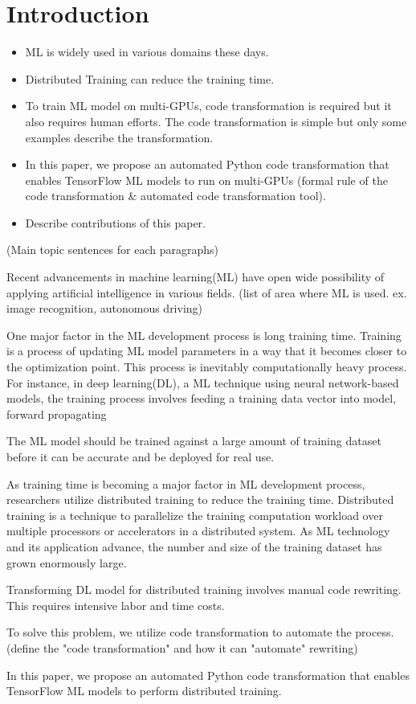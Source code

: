 \section{Introduction}\label{sec:intro}
\begin{itemize}
  \item ML is widely used in various domains these days.
  \item Distributed Training can reduce the training time.
  \item To train ML model on multi-GPUs, code transformation is required but it
    also requires human efforts. The code transformation is simple but only
    some examples describe the transformation.
  \item In this paper, we propose an automated Python code transformation that
    enables TensorFlow ML models to run on multi-GPUs (formal rule of the code
    transformation \& automated code transformation tool).
  \item Describe contributions of this paper.
\end{itemize}

(Main topic sentences for each paragraphs)

Recent advancements in machine learning(ML) have open wide possibility of
applying artificial intelligence in various fields.
(list of area where ML is used. ex. image recognition, autonomous driving)

One major factor in the ML development process is long training time.
Training is a process of updating ML model parameters in a way
that it becomes closer to the optimization point.
This process is inevitably computationally heavy process.
For instance, in deep learning(DL), a ML technique using
neural network-based models, the training process involves
feeding a training data vector into model, forward propagating 

The ML model should be trained against a large amount of training dataset
before it can be accurate and be deployed for real use.

As training time is becoming a major factor in ML development process,
researchers utilize distributed training to reduce the training time.
Distributed training is a technique to parallelize the training computation
workload over multiple processors or accelerators in a distributed system.
As ML technology and its application advance, the number and size of
the training dataset has grown enormously large.

Transforming DL model for distributed training involves
manual code rewriting. This requires intensive labor and time costs.

To solve this problem, we utilize code transformation to automate the process.
(define the "code transformation" and how it can "automate" rewriting)

In this paper, we propose an automated Python code transformation that enables
TensorFlow ML models to perform distributed training.

